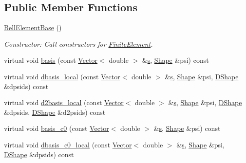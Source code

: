 \subsection*{Public Member Functions}
\begin{DoxyCompactItemize}
\item 
\hyperlink{classoomph_1_1BellElementBase_a79c5e60fb98c9e69b096ed84b3430376}{Bell\+Element\+Base} ()
\begin{DoxyCompactList}\small\item\em Constructor\+: Call constructors for \hyperlink{classoomph_1_1FiniteElement}{Finite\+Element}. \end{DoxyCompactList}\item 
virtual void \hyperlink{classoomph_1_1BellElementBase_aee9266910010dcfca375fe0de13c17bb}{basis} (const \hyperlink{classoomph_1_1Vector}{Vector}$<$ double $>$ \&\hyperlink{cfortran_8h_ab7123126e4885ef647dd9c6e3807a21c}{s}, \hyperlink{classoomph_1_1Shape}{Shape} \&psi) const
\item 
virtual void \hyperlink{classoomph_1_1BellElementBase_a02f75fd57e4f6329a4b551df3d3c81eb}{dbasis\+\_\+local} (const \hyperlink{classoomph_1_1Vector}{Vector}$<$ double $>$ \&\hyperlink{cfortran_8h_ab7123126e4885ef647dd9c6e3807a21c}{s}, \hyperlink{classoomph_1_1Shape}{Shape} \&psi, \hyperlink{classoomph_1_1DShape}{D\+Shape} \&dpsids) const
\item 
virtual void \hyperlink{classoomph_1_1BellElementBase_ac6c1add4a996cf149da6c85ee3f4b637}{d2basis\+\_\+local} (const \hyperlink{classoomph_1_1Vector}{Vector}$<$ double $>$ \&\hyperlink{cfortran_8h_ab7123126e4885ef647dd9c6e3807a21c}{s}, \hyperlink{classoomph_1_1Shape}{Shape} \&psi, \hyperlink{classoomph_1_1DShape}{D\+Shape} \&dpsids, \hyperlink{classoomph_1_1DShape}{D\+Shape} \&d2psids) const
\item 
virtual void \hyperlink{classoomph_1_1BellElementBase_a2c9a75b9d07c0aa569ba24d2b3228800}{basis\+\_\+c0} (const \hyperlink{classoomph_1_1Vector}{Vector}$<$ double $>$ \&\hyperlink{cfortran_8h_ab7123126e4885ef647dd9c6e3807a21c}{s}, \hyperlink{classoomph_1_1Shape}{Shape} \&psi) const
\item 
virtual void \hyperlink{classoomph_1_1BellElementBase_ae863013db88be8402457a77eb5d5862f}{dbasis\+\_\+c0\+\_\+local} (const \hyperlink{classoomph_1_1Vector}{Vector}$<$ double $>$ \&\hyperlink{cfortran_8h_ab7123126e4885ef647dd9c6e3807a21c}{s}, \hyperlink{classoomph_1_1Shape}{Shape} \&psi, \hyperlink{classoomph_1_1DShape}{D\+Shape} \&dpsids) const
\item 

\end{DoxyCompactItemize}
